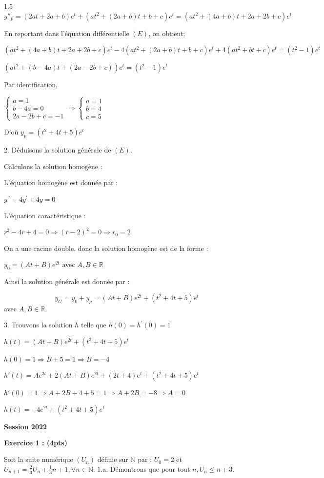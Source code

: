 \documentclass[12pt]{article}
\begin{document}
\begin{spacing}{1.5}
$y''_p=(2at+2a+b)e^t+(at^2+(2a+b)t+b+c)e^t=(at^2+(4a+b)t+2a+2b+c)e^t$

En reportant dans l'équation différentielle $(E)$, on obtient;

$(at^2+(4a+b)t+2a+2b+c)e^t-4(at^2+(2a+b)t+b+c)e^t+4(at^2+bt+c)e^t=(t^2 - 1)e^t$

$(at^2+(b-4a)t+(2a-2b+c))e^t=(t^2 - 1)e^t$

Par identification,

$\begin{cases}
a=1\\
b-4a=0\\
2a-2b+c=-1
\end{cases}\Rightarrow \begin{cases}
a=1\\
b=4\\
c=5
\end{cases}$

D'où $y_p=(t^2+4t+5)e^t$

2. Déduisons la solution générale de $(E)$.

Calculons la solution homogène :

L'équation homogène est donnée par :

$y^{\prime\prime}-4y^{\prime} + 4y =0$

L'équation caractéristique :

$r^2-4r+4=0\Rightarrow (r-2)^2=0\Rightarrow r_0=2$

On a une racine double, donc la solution homogène est de la forme :

$y_0=(At+B)e^{2t}$ avec $A,B\in \mathbb{R}$

Ainsi la solution générale est donnée par :

\[
y_G=y_0+y_p=(At+B)e^{2t}+(t^2+4t+5)e^t\] avec $A,B\in \mathbb{R}$


3. Trouvons la solution $h$ telle que $h(0)=h^{\prime}(0)=1$

$h(t)=(At+B)e^{2t}+(t^2+4t+5)e^t$

$h(0)=1\Rightarrow B+5=1\Rightarrow B=-4$

$h'(t)=Ae^{2t}+2(At+B)e^{2t}+(2t+4)e^t+(t^2+4t+5)e^t$

$h'(0)=1\Rightarrow A+2B+4+5=1\Rightarrow A+2B=-8\Rightarrow A=0$

$h(t)=-4e^{2t}+(t^2+4t+5)e^t$

\medskip
\textbf{Session 2022}

\textbf{Exercice 1 : (4pts)}

Soit la suite numérique $(U_n)$ définie sur $\mathbb{N}$ par : $U_0 = 2$ et $U_{n+1} = \frac{2}{3}U_n + \frac{1}{3}n + 1, \forall {n\in \mathbb{N}}$.
1.a. Démontrons que pour tout $n, U_n\leq n+3$.


\end{spacing}
\end{document}
